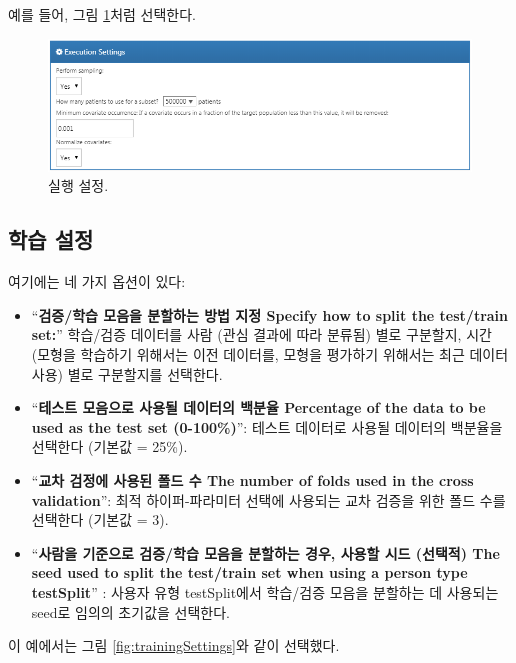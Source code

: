 \documentclass[10.5pt]{book}
\providecommand{\tightlist}{%
  \setlength{\itemsep}{0pt}\setlength{\parskip}{0pt}}
\theoremstyle{definition}
\theoremstyle{definition}
\theoremstyle{definition}
\theoremstyle{remark}
\begin{document}
예를 들어, 그림 \ref{fig:executionSettings}처럼 선택한다.

\begin{figure}

{\centering \includegraphics[width=1\linewidth]{images/PatientLevelPrediction/executionSettings} 

}

\caption{실행 설정.}\label{fig:executionSettings}
\end{figure}

\subsection{학습 설정}\label{-}

여기에는 네 가지 옵션이 있다:

\begin{itemize}
\tightlist
\item
  ``\textbf{검증/학습 모음을 분할하는 방법 지정 Specify how to split the
  test/train set:}'' 학습/검증 데이터를 사람 (관심 결과에 따라 분류됨)
  별로 구분할지, 시간 (모형을 학습하기 위해서는 이전 데이터를, 모형을
  평가하기 위해서는 최근 데이터 사용) 별로 구분할지를 선택한다.
\item
  ``\textbf{테스트 모음으로 사용될 데이터의 백분율 Percentage of the
  data to be used as the test set (0-100\%)}'': 테스트 데이터로 사용될
  데이터의 백분율을 선택한다 (기본값 = 25\%).
\item
  ``\textbf{교차 검정에 사용된 폴드 수 The number of folds used in the
  cross validation}'': 최적 하이퍼-파라미터 선택에 사용되는 교차 검증을
  위한 폴드 수를 선택한다 (기본값 = 3).
\item
  ``\textbf{사람을 기준으로 검증/학습 모음을 분할하는 경우, 사용할 시드
  (선택적) The seed used to split the test/train set when using a person
  type testSplit}'' : 사용자 유형 testSplit에서 학습/검증 모음을
  분할하는 데 사용되는 seed로 임의의 초기값을 선택한다.
\end{itemize}

이 예에서는 그림 \ref{fig:trainingSettings}와 같이 선택했다.
\end{document}
